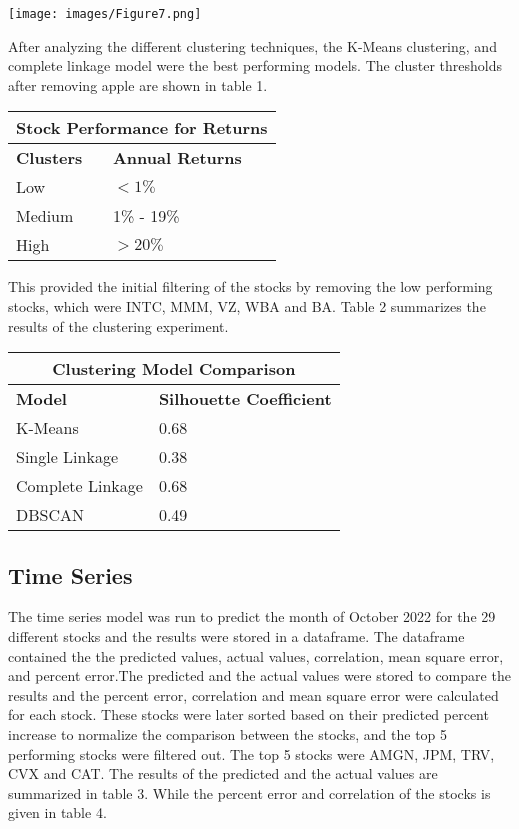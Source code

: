 \documentclass[12pt,a4paper, twoside]{article}
\begin{document}
\begin{multicols}{2}
    \begin{center}
        \texttt{[image: images/Figure7.png]}
    \end{center}
 
After analyzing the different clustering techniques, the K-Means clustering, and complete linkage model were the best performing models. The cluster thresholds after removing apple are shown in table 1.
\begin{center}
\begin{tabular}{ |p{3cm}|p{2cm}|  }
\hline
\multicolumn{2}{|c|}{\textbf{Stock Performance for Returns}} \\
\hline
\textbf{Clusters} & \textbf{Annual Returns} \\
\hline
Low & $<1\%$ \\
Medium & 1\% - 19\% \\
High & $>20\%$ \\
\hline
\end{tabular}
\end{center}

This provided the initial filtering of the stocks by removing the low performing stocks, which were INTC, MMM, VZ, WBA and BA. Table 2 summarizes the results of the clustering experiment. 

\begin{center}
\begin{tabular}{ | p{3.5cm} |p{2.5cm}|  }
\hline
\multicolumn{2}{|c|}{\textbf{Clustering Model Comparison}} \\
\hline
\textbf{Model} & \textbf{Silhouette Coefficient} \\
\hline
K-Means & 0.68 \\
Single Linkage & 0.38\\
Complete Linkage & 0.68 \\
DBSCAN & 0.49 \\
\hline
\end{tabular}
\end{center}

\subsection{Time Series}
The time series model was run to predict the month of October 2022 for the 29 different stocks and the results were stored in a dataframe. The dataframe contained the the predicted values, actual values, correlation, mean square error, and percent error.The predicted and the actual values were stored to compare the results and the percent error, correlation and mean square error were calculated for each stock. These stocks were later sorted based on their predicted percent increase to normalize the comparison between the stocks, and the top 5 performing stocks were filtered out. The top 5 stocks were AMGN, JPM, TRV, CVX and CAT. The results of the predicted and the actual values are summarized in table 3. While the percent error and correlation of the stocks is given in table 4.


\end{multicols}
\end{document}
